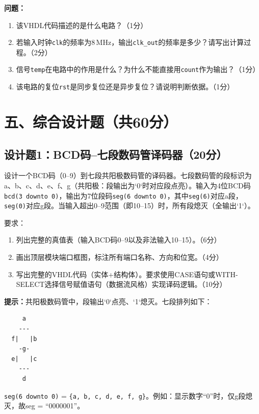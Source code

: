 \begin{framed}
\textbf{问题：}
\begin{enumerate}[label=(\arabic*)]
  \item 该VHDL代码描述的是什么电路？（1分）
  \item 若输入时钟\verb|clk|的频率为8\,MHz，输出\verb|clk_out|的频率是多少？请写出计算过程。（2分）
  \item 信号\verb|temp|在电路中的作用是什么？为什么不能直接用\verb|count|作为输出？（1分）
  \item 该电路的复位\verb|rst|是同步复位还是异步复位？请说明判断依据。（1分）
\end{enumerate}
\end{framed}

\newpage

\section*{五、综合设计题（共60分）}

\subsection*{设计题1：BCD码--七段数码管译码器（20分）}

设计一个BCD码（0--9）到七段共阳极数码管的译码器。七段数码管的段标识为a、b、c、d、e、f、g（共阳极：段输出为`0`时对应段点亮）。输入为4位BCD码\verb|bcd(3 downto 0)|，输出为7位段码\verb|seg(6 downto 0)|，其中\verb|seg(6)|对应a段，\verb|seg(0)|对应g段。当输入超出0--9范围（即10--15）时，所有段熄灭（全输出`1`）。

要求：

\begin{enumerate}[label=(\arabic*)]
  \item 列出完整的真值表（输入BCD码0--9以及非法输入10--15）。（6分）
  \item 画出顶层模块端口框图，标注所有端口名称、方向和位宽。（4分）
  \item 写出完整的VHDL代码（实体+结构体）。要求使用CASE语句或WITH-SELECT选择信号赋值语句（数据流风格）实现译码逻辑。（10分）
\end{enumerate}

\begin{framed}
\textbf{提示：}共阳极数码管中，段输出`0`点亮、`1`熄灭。七段排列如下：
\begin{verbatim}
     a
    ---
  f|   |b
    -g-
  e|   |c
    ---
     d
\end{verbatim}
\verb|seg(6 downto 0)| = \verb|{a, b, c, d, e, f, g}|。例如：显示数字“0”时，仅g段熄灭，故seg = ``0000001''。
\end{framed}

